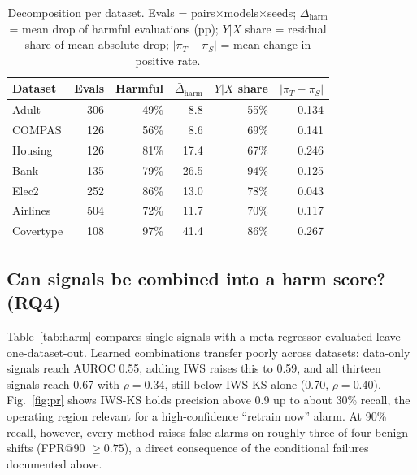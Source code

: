 \documentclass[conference]{IEEEtran}
\theoremstyle{plainhead}
\newcommand{\iws}{\textsc{IWS}}
\begin{document}
\begin{table}[t]
\centering
\caption{Decomposition per dataset. Evals = pairs$\times$models$\times$seeds; $\bar\Delta_\text{harm}$ = mean drop of harmful evaluations (pp); $Y|X$ share = residual share of mean absolute drop; $|\pi_T-\pi_S|$ = mean change in positive rate.}
\label{tab:decomp}
\footnotesize
\setlength{\tabcolsep}{3.5pt}
\begin{tabular}{lrrrrr}
\toprule
Dataset & Evals & Harmful & $\bar\Delta_{\text{harm}}$ & $Y|X$ share & $|\pi_T-\pi_S|$ \\
\midrule
Adult & 306 & 49\% & 8.8 & 55\% & 0.134 \\
COMPAS & 126 & 56\% & 8.6 & 69\% & 0.141 \\
Housing & 126 & 81\% & 17.4 & 67\% & 0.246 \\
Bank & 135 & 79\% & 26.5 & 94\% & 0.125 \\
Elec2 & 252 & 86\% & 13.0 & 78\% & 0.043 \\
Airlines & 504 & 72\% & 11.7 & 70\% & 0.117 \\
Covertype & 108 & 97\% & 41.4 & 86\% & 0.267 \\
\bottomrule
\end{tabular}
\end{table}

\subsection{Can signals be combined into a harm score? (RQ4)}
Table~\ref{tab:harm} compares single signals with a meta-regressor evaluated leave-one-dataset-out. Learned combinations transfer poorly across datasets: data-only signals reach AUROC 0.55, adding \iws{} raises this to 0.59, and all thirteen signals reach 0.67 with $\rho=0.34$, still below \iws{}-KS alone (0.70, $\rho=0.40$). Fig.~\ref{fig:pr} shows \iws{}-KS holds precision above 0.9 up to about 30\% recall, the operating region relevant for a high-confidence ``retrain now'' alarm. At 90\% recall, however, every method raises false alarms on roughly three of four benign shifts (FPR@90 $\ge0.75$), a direct consequence of the conditional failures documented above.
\end{document}
